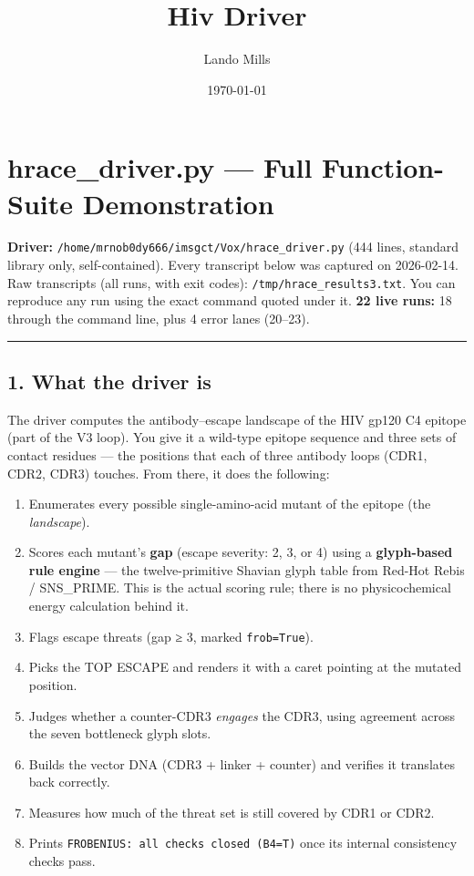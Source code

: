 \documentclass[12pt,a4paper]{article}
\title{Hiv Driver}
\date{\today}
\author{Lando Mills}
\providecommand{\tightlist}{%
  \setlength{\itemsep}{0pt}\setlength{\parskip}{0pt}%
}
\begin{document}
\maketitle
\hypertarget{hrace_driver.py-full-function-suite-demonstration}{%
\section{hrace\_driver.py --- Full Function-Suite
Demonstration}\label{hrace_driver.py-full-function-suite-demonstration}}

\textbf{Driver:} \texttt{/home/mrnob0dy666/imsgct/Vox/hrace\_driver.py}
(444 lines, standard library only, self-contained). Every transcript
below was captured on 2026-02-14. Raw transcripts (all runs, with exit
codes): \texttt{/tmp/hrace\_results3.txt}. You can reproduce any run
using the exact command quoted under it. \textbf{22 live runs:} 18
through the command line, plus 4 error lanes (20--23).

\begin{center}\rule{0.5\linewidth}{0.5pt}\end{center}

\hypertarget{what-the-driver-is}{%
\subsection{1. What the driver is}\label{what-the-driver-is}}

The driver computes the antibody--escape landscape of the HIV gp120 C4
epitope (part of the V3 loop). You give it a wild-type epitope sequence
and three sets of contact residues --- the positions that each of three
antibody loops (CDR1, CDR2, CDR3) touches. From there, it does the
following:

\begin{enumerate}
\def\labelenumi{\arabic{enumi}.}
\tightlist
\item
  Enumerates every possible single-amino-acid mutant of the epitope (the
  \emph{landscape}).
\item
  Scores each mutant's \textbf{gap} (escape severity: 2, 3, or 4) using
  a \textbf{glyph-based rule engine} --- the twelve-primitive Shavian
  glyph table from Red-Hot Rebis / SNS\_PRIME. This is the actual
  scoring rule; there is no physicochemical energy calculation behind
  it.
\item
  Flags escape threats (gap ≥ 3, marked \texttt{frob=True}).
\item
  Picks the TOP ESCAPE and renders it with a caret pointing at the
  mutated position.
\item
  Judges whether a counter-CDR3 \emph{engages} the CDR3, using agreement
  across the seven bottleneck glyph slots.
\item
  Builds the vector DNA (CDR3 + linker + counter) and verifies it
  translates back correctly.
\item
  Measures how much of the threat set is still covered by CDR1 or CDR2.
\item
  Prints \texttt{FROBENIUS:\ all\ checks\ closed\ (B4=T)} once its
  internal consistency checks pass.
\end{enumerate}
\end{document}
